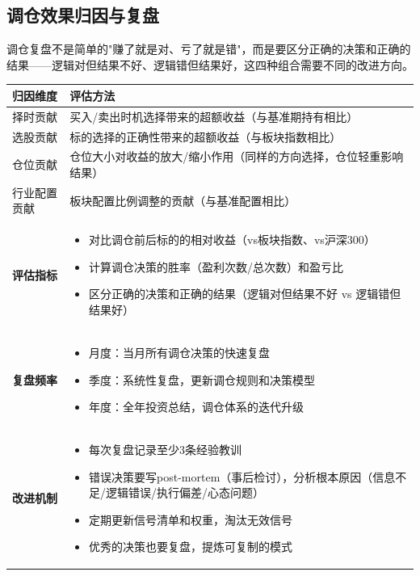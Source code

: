 \subsection{调仓效果归因与复盘}

调仓复盘不是简单的"赚了就是对、亏了就是错"，而是要区分正确的决策和正确的结果——逻辑对但结果不好、逻辑错但结果好，这四种组合需要不同的改进方向。

\begin{exhibitbox}[表9-28：调仓效果归因框架]
\scriptsize
\setlength{\tabcolsep}{3pt}
\renewcommand{\arraystretch}{1.15}
\begin{tabularx}{\textwidth}{l X}
\toprule
\textbf{归因维度} & \textbf{评估方法} \\
\midrule
择时贡献 & 买入/卖出时机选择带来的超额收益（与基准期持有相比） \\
选股贡献 & 标的选择的正确性带来的超额收益（与板块指数相比） \\
仓位贡献 & 仓位大小对收益的放大/缩小作用（同样的方向选择，仓位轻重影响结果） \\
行业配置贡献 & 板块配置比例调整的贡献（与基准配置相比） \\
\midrule
\textbf{评估指标} & 
\begin{itemize}[leftmargin=1.2em]
\item 对比调仓前后标的的相对收益（vs板块指数、vs沪深300）
\item 计算调仓决策的胜率（盈利次数/总次数）和盈亏比
\item 区分正确的决策和正确的结果（逻辑对但结果不好 vs 逻辑错但结果好）
\end{itemize}
\\
\midrule
\textbf{复盘频率} & 
\begin{itemize}[leftmargin=1.2em]
\item 月度：当月所有调仓决策的快速复盘
\item 季度：系统性复盘，更新调仓规则和决策模型
\item 年度：全年投资总结，调仓体系的迭代升级
\end{itemize}
\\
\midrule
\textbf{改进机制} & 
\begin{itemize}[leftmargin=1.2em]
\item 每次复盘记录至少3条经验教训
\item 错误决策要写post-mortem（事后检讨），分析根本原因（信息不足/逻辑错误/执行偏差/心态问题）
\item 定期更新信号清单和权重，淘汰无效信号
\item 优秀的决策也要复盘，提炼可复制的模式
\end{itemize}
\\
\bottomrule
\end{tabularx}
\end{exhibitbox}


